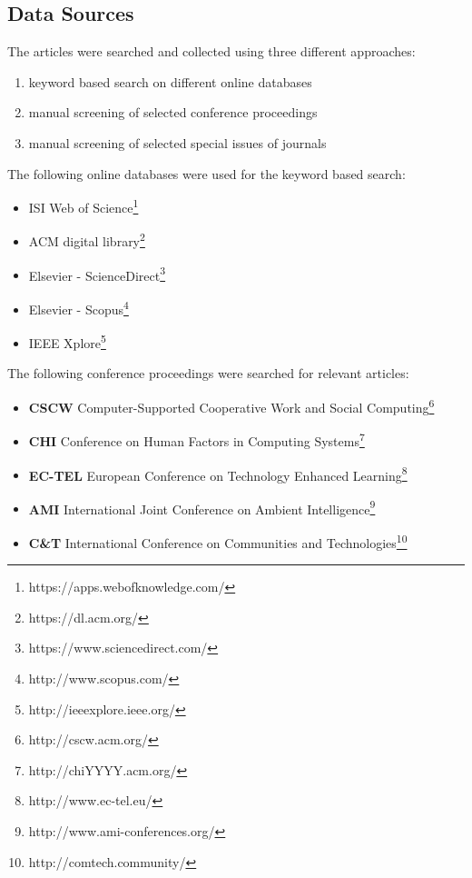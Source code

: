 \subsection{Data Sources}
The articles were searched and collected using three different approaches:

\begin{enumerate}
\item keyword based search on different online databases
\item manual screening of selected conference proceedings
\item manual screening of selected special issues of journals
\end{enumerate}

The following online databases were used for the keyword based search:
\begin{itemize}
\item ISI Web of Science\footnote{https://apps.webofknowledge.com/}
\item ACM digital library\footnote{https://dl.acm.org/}
\item Elsevier - ScienceDirect\footnote{https://www.sciencedirect.com/}
\item Elsevier - Scopus\footnote{http://www.scopus.com/}
\item IEEE Xplore\footnote{http://ieeexplore.ieee.org/}
\end{itemize}

The following conference proceedings were searched for relevant articles:
\begin{itemize}
\item \textbf{CSCW} Computer-Supported Cooperative Work and Social Computing\footnote{http://cscw.acm.org/}
\item \textbf{CHI} Conference on Human Factors in Computing Systems\footnote{http://chiYYYY.acm.org/}
\item \textbf{EC-TEL} European Conference on Technology Enhanced Learning\footnote{http://www.ec-tel.eu/}
\item \textbf{AMI} International Joint Conference on Ambient Intelligence\footnote{http://www.ami-conferences.org/}
\item \textbf{C\&T} International Conference on Communities and Technologies\footnote{http://comtech.community/}
\end{itemize}


